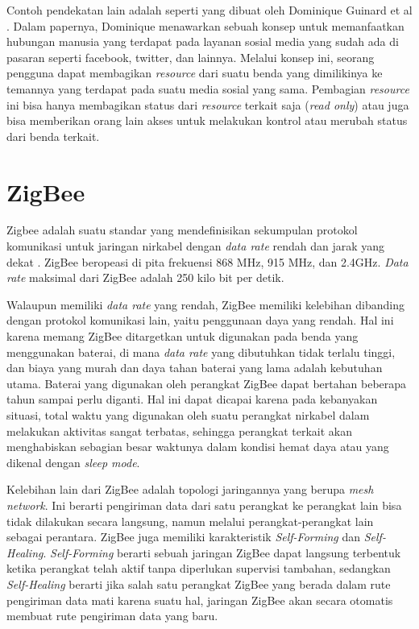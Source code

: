 Contoh pendekatan lain adalah seperti yang dibuat oleh Dominique Guinard et al \cite{guinard2010sharing}. Dalam papernya, Dominique menawarkan sebuah konsep untuk memanfaatkan hubungan manusia yang terdapat pada layanan sosial media yang sudah ada di pasaran seperti facebook, twitter, dan lainnya. Melalui konsep ini, seorang pengguna dapat membagikan \textit{resource} dari suatu benda yang dimilikinya ke temannya yang terdapat pada suatu media sosial yang sama. Pembagian \textit{resource} ini bisa hanya membagikan status dari \textit{resource} terkait saja (\textit{read only}) atau juga bisa memberikan orang lain akses untuk melakukan kontrol atau merubah status dari benda terkait.

\section{ZigBee}
Zigbee adalah suatu standar yang mendefinisikan sekumpulan protokol komunikasi untuk jaringan nirkabel dengan \textit{data rate} rendah dan jarak yang dekat \cite{farahani2011zigbee}. ZigBee beropeasi di pita frekuensi 868 MHz, 915 MHz, dan 2.4GHz. \textit{Data rate} maksimal dari ZigBee adalah 250 kilo bit per detik.

Walaupun memiliki \textit{data rate} yang rendah, ZigBee memiliki kelebihan dibanding dengan protokol komunikasi lain, yaitu penggunaan daya yang rendah. Hal ini karena memang ZigBee ditargetkan untuk digunakan pada benda yang menggunakan baterai, di mana \textit{data rate} yang dibutuhkan tidak terlalu tinggi, dan biaya yang murah dan daya tahan baterai yang lama adalah kebutuhan utama. Baterai yang digunakan oleh perangkat ZigBee dapat bertahan beberapa tahun sampai perlu diganti. Hal ini dapat dicapai karena pada kebanyakan situasi, total waktu yang digunakan oleh suatu perangkat nirkabel dalam melakukan aktivitas sangat terbatas, sehingga perangkat terkait akan menghabiskan sebagian besar waktunya dalam kondisi hemat daya atau yang dikenal dengan \textit{sleep mode}\cite{farahani2011zigbee}.

Kelebihan lain dari ZigBee adalah topologi jaringannya yang berupa \textit{mesh network}. Ini berarti pengiriman data dari satu perangkat ke perangkat lain bisa tidak dilakukan secara langsung, namun melalui perangkat-perangkat lain sebagai perantara. ZigBee juga memiliki karakteristik \textit{Self-Forming} dan \textit{Self-Healing}. \textit{Self-Forming} berarti sebuah jaringan ZigBee dapat langsung terbentuk ketika perangkat telah aktif tanpa diperlukan supervisi tambahan, sedangkan \textit{Self-Healing} berarti jika salah satu perangkat ZigBee yang berada dalam rute pengiriman data mati karena suatu hal, jaringan ZigBee akan secara otomatis membuat rute pengiriman data yang baru.

